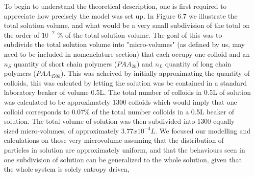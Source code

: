 \documentclass[journal=jacsat,manuscript=article]{achemso}
\begin{document}
To begin to understand the theoretical description, one is first required to appreciate how precisely the model was set up. In Figure 6.7 we illustrate the total solution volume, and what would be a very small subdivision of the total on the order of $10^{-2}$ \% of the total solution volume. The goal of this was to subdivide the total solution volume into "micro-volumes" (as defined by us, may need to be included in nomenclature section) that each occupy one colloid and an $n_S$ quantity of short chain polymers ($PAA_{2k}$) and $n_L$ quantity of long chain polymers ($PAA_{450k}$). This was acheived by initially approximating the quantity of colloids, this was calcuted by letting the solution was be contained in a standard laboratory beaker of volume 0.5L. The total number of colloids in 0.5L of solution was calculated to be approximately 1300 colloids which would imply that one colloid corresponds to 0.07\% of the total number colloids in a 0.5L beaker of solution. The total volume of solution was then subdivided into 1300 equally sized micro-volumes, of approximately $3.77 x 10^{-4}L$. We focused our modelling and calculations on those very microvolume assuming that the distribution of particles in solution are approximately uniform, and that the behaviours seen in one subdivision of solution can be generalized to the whole solution, given that the whole system is solely entropy driven, 

\end{document}
